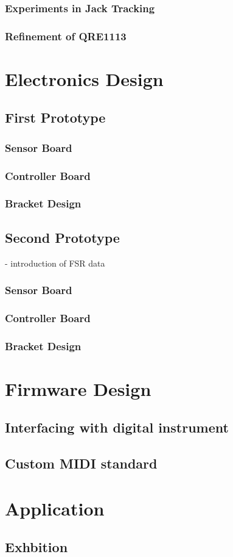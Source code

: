\subsubsection{Experiments in Jack Tracking}\label{experiments-in-jack-tracking}
\subsubsection{Refinement of QRE1113}\label{refinement-of-qre1113}


\section{Electronics Design}\label{hardware-design}
\subsection{First Prototype}
\subsubsection{Sensor Board}\label{sensor-board}
\subsubsection{Controller Board}\label{controller-board}
\subsubsection{Bracket Design}\label{controller-board}
\subsection{Second Prototype}
- introduction of FSR data
\subsubsection{Sensor Board}\label{sensor-board}
\subsubsection{Controller Board}\label{controller-board}
\subsubsection{Bracket Design}\label{controller-board}

\section{Firmware Design}\label{hardware-design}
\subsection{Interfacing with digital instrument}\label{interfacing-with-digital-instrument}
\subsection{Custom MIDI standard}\label{custom-midi-standard}

\section{Application}\label{application-2}
\subsection{Exhbition}\label{interfacing-with-digital-instrument}



